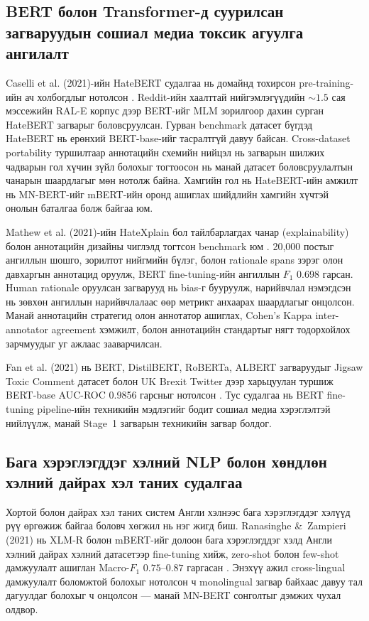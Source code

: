 \subsection{BERT болон Transformer-д суурилсан загваруудын сошиал медиа токсик
агуулга ангилалт}

Caselli et al. (2021)-ийн HateBERT судалгаа нь домайнд тохирсон pre-training-ийн
ач холбогдлыг нотолсон \cite{caselli2021}. Reddit-ийн хаалттай нийгэмлэгүүдийн
${\sim}1.5$ сая мэссежийн RAL-E корпус дээр BERT-ийг MLM зорилгоор дахин сурган
HateBERT загварыг боловсруулсан. Гурван benchmark датасет бүгдэд HateBERT нь
ерөнхий BERT-base-ийг тасралтгүй давуу байсан. Cross-dataset portability
туршилтаар аннотацийн схемийн нийцэл нь загварын шилжих чадварын гол хүчин
зүйл болохыг тогтоосон нь манай датасет боловсруулалтын чанарын шаардлагыг мөн
нотолж байна. Хамгийн гол нь HateBERT-ийн амжилт нь MN-BERT-ийг mBERT-ийн
оронд ашиглах шийдлийн хамгийн хүчтэй онолын баталгаа болж байгаа юм.

Mathew et al. (2021)-ийн HateXplain бол тайлбарлагдах чанар (explainability)
болон аннотацийн дизайны чиглэлд тогтсон benchmark юм \cite{mathew2021}. 20,000
постыг ангиллын шошго, зорилтот нийгмийн бүлэг, болон rationale spans зэрэг
олон давхаргын аннотацид оруулж, BERT fine-tuning-ийн ангиллын $F_1$ 0.698
гарсан. Human rationale оруулсан загварууд нь bias-г бууруулж, нарийвчлал
нэмэгдсэн нь зөвхөн ангиллын нарийвчлалаас өөр метрикт анхаарах шаардлагыг
онцолсон. Манай аннотацийн стратегид олон аннотатор ашиглах, Cohen's Kappa
inter-annotator agreement хэмжилт, болон аннотацийн стандартыг нягт тодорхойлох
зарчмуудыг уг ажлаас зааварчилсан.

Fan et al. (2021) нь BERT, DistilBERT, RoBERTa, ALBERT загваруудыг Jigsaw
Toxic Comment датасет болон UK Brexit Twitter дээр харьцуулан туршиж
BERT-base AUC-ROC 0.9856 гарсныг нотолсон \cite{fan2021}. Тус судалгаа нь
BERT fine-tuning pipeline-ийн техникийн мэдлэгийг бодит сошиал медиа
хэрэглэлтэй нийлүүлж, манай Stage~1 загварын техникийн загвар болдог.

\subsection{Бага хэрэглэгддэг хэлний NLP болон хөндлөн хэлний дайрах хэл
таних судалгаа}

Хортой болон дайрах хэл таних систем Англи хэлнээс бага хэрэглэгддэг хэлүүд
рүү өргөжиж байгаа боловч хөгжил нь нэг жигд биш. Ranasinghe \&\ Zampieri
(2021) нь XLM-R болон mBERT-ийг долоон бага хэрэглэгддэг хэлд Англи хэлний
дайрах хэлний датасетээр fine-tuning хийж, zero-shot болон few-shot дамжуулалт
ашиглан Macro-$F_1$ $0.75$--$0.87$ гаргасан \cite{ranasinghe2021}. Энэхүү ажил
cross-lingual дамжуулалт боломжтой болохыг нотолсон ч monolingual загвар
байхаас давуу тал дагуулдаг болохыг ч онцолсон --- манай MN-BERT сонголтыг
дэмжих чухал олдвор.

